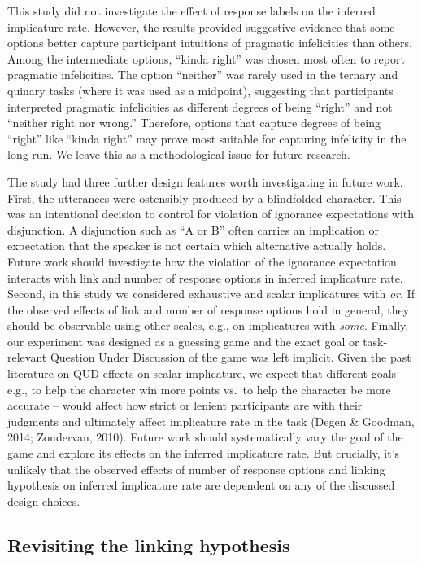 \documentclass[man]{apa6}
\theoremstyle{definition}
\theoremstyle{definition}
\theoremstyle{definition}
\theoremstyle{remark}
\begin{document}
This study did not investigate the effect of response labels on the
inferred implicature rate. However, the results provided suggestive
evidence that some options better capture participant intuitions of
pragmatic infelicities than others. Among the intermediate options,
\enquote{kinda right} was chosen most often to report pragmatic
infelicities. The option \enquote{neither} was rarely used in the
ternary and quinary tasks (where it was used as a midpoint), suggesting
that participants interpreted pragmatic infelicities as different
degrees of being \enquote{right} and not \enquote{neither right nor
wrong.} Therefore, options that capture degrees of being \enquote{right}
like \enquote{kinda right} may prove most suitable for capturing
infelicity in the long run. We leave this as a methodological issue for
future research.

The study had three further design features worth investigating in
future work. First, the utterances were ostensibly produced by a
blindfolded character. This was an intentional decision to control for
violation of ignorance expectations with disjunction. A disjunction such
as \enquote{A or B} often carries an implication or expectation that the
speaker is not certain which alternative actually holds. Future work
should investigate how the violation of the ignorance expectation
interacts with link and number of response options in inferred
implicature rate. Second, in this study we considered exhaustive and
scalar implicatures with \emph{or}. If the observed effects of link and
number of response options hold in general, they should be observable
using other scales, e.g., on implicatures with \emph{some}. Finally, our
experiment was designed as a guessing game and the exact goal or
task-relevant Question Under Discussion of the game was left implicit.
Given the past literature on QUD effects on scalar implicature, we
expect that different goals -- e.g., to help the character win more
points vs.~to help the character be more accurate -- would affect how
strict or lenient participants are with their judgments and ultimately
affect implicature rate in the task (Degen \& Goodman, 2014; Zondervan,
2010). Future work should systematically vary the goal of the game and
explore its effects on the inferred implicature rate. But crucially,
it's unlikely that the observed effects of number of response options
and linking hypothesis on inferred implicature rate are dependent on any
of the discussed design choices.

\subsection{Revisiting the linking
hypothesis}\label{revisiting-linking-hypothesis}
\end{document}
